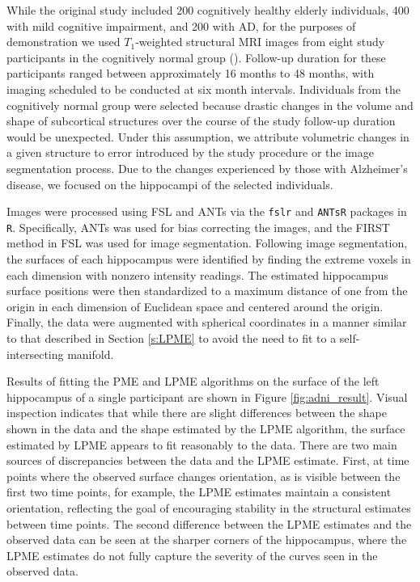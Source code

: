 \documentclass[11pt,reqno]{article}
\newcommand{\zielinski}[1]{{\color{blue} \sf $\spadesuit\spadesuit\spadesuit$ Rob Zielinski: [#1]}}
\theoremstyle{definition}
\begin{document}
While the original study included 200 cognitively healthy elderly individuals, 400 with mild cognitive impairment, and 200 with AD, for the purposes of demonstration we used $T_1$-weighted structural MRI images from eight study participants in the cognitively normal group (\cite{jack2008adni}). Follow-up duration for these participants ranged between approximately 16 months to 48 months, with imaging scheduled to be conducted at six month intervals. Individuals from the cognitively normal group were selected because drastic changes in the volume and shape of subcortical structures over the course of the study follow-up duration would be unexpected. Under this assumption, we attribute volumetric changes in a given structure to error introduced by the study procedure or the image segmentation process. Due to the changes experienced by those with Alzheimer's disease, we focused on the hippocampi of the selected individuals.

Images were processed using FSL and ANTs via the \texttt{fslr} and \texttt{ANTsR} packages in \texttt{R}. Specifically, ANTs was used for bias correcting the images, and the FIRST method in FSL was used for image segmentation. Following image segmentation, the surfaces of each hippocampus were identified by finding the extreme voxels in each dimension with nonzero intensity readings. The estimated hippocampus surface positions were then standardized to a maximum distance of one from the origin in each dimension of Euclidean space and centered around the origin. Finally, the data were augmented with spherical coordinates in a manner similar to that described in Section \ref{s:LPME} to avoid the need to fit to a self-intersecting manifold.


Results of fitting the PME and LPME algorithms on the surface of the left hippocampus of a single participant are shown in Figure \ref{fig:adni_result}. Visual inspection indicates that while there are slight differences between the shape shown in the data and the shape estimated by the LPME algorithm, the surface estimated by LPME appears to fit reasonably to the data. There are two main sources of discrepancies between the data and the LPME estimate. First, at time points where the observed surface changes orientation, as is visible between the first two time points, for example, the LPME estimates maintain a consistent orientation, reflecting the goal of encouraging stability in the structural estimates between time points. The second difference between the LPME estimates and the observed data can be seen at the sharper corners of the hippocampus, where the LPME estimates do not fully capture the severity of the curves seen in the observed data.
\end{document}
